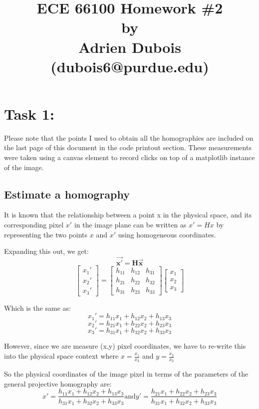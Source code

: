 \documentclass{article}
\title{\Large \textbf{ECE 66100 Homework \#2\\[0.1in] by\\ [0.1in] Adrien Dubois (dubois6@purdue.edu)}}
\begin{document}
\maketitle
\section{Task 1:}
Please note that the points I used to obtain all the homographies are included on the last page of this document in the code printout section. These measurements were taken using a canvas element to record clicks on top of a matplotlib instance of the image.

\subsection{Estimate a homography}\label{sec:estimate-homography}
It is known that the relationship between a point x in the physical space, and its corresponding pixel $x'$ in the image plane can be written as \(x' = Hx\) by representing the two points $x$ and $x'$ using homogeneous coordinates.


Expanding this out, we get:
\[\boldsymbol{\Vec{x'}} = \boldsymbol{H} \boldsymbol{\Vec{x}}\]
\[
\begin{bmatrix}
    x_1' \\ x_2' \\ x_3'
\end{bmatrix} = \begin{bmatrix}
    h_{11} & h_{12} & h_{31} \\
    h_{21} & h_{22} & h_{32} \\
    h_{31} & h_{23} & h_{33}
\end{bmatrix} \begin{bmatrix}
    x_1 \\ x_2 \\ x_3
\end{bmatrix}
\] 

Which is the same as:
\[x_1' = h_{11} x_1 + h_{12} x_2 + h_{13} x_3\]
\[x_2' = h_{21} x_1 + h_{22} x_2 + h_{23} x_3\]
\[x_3' = h_{31} x_1 + h_{32} x_2 + h_{33} x_3\]

However, since we are measure (x,y) pixel coordinates, we have to re-write this into the physical space context where $x = \frac{x_1}{x_3}$ and $y = \frac{x_2}{x_3}$

So the physical coordinates of the image pixel in terms of the parameters of the general projective homography are:
\[x' = \frac{h_{11}x_1 + h_{12}x_2 + h_{13}x_3}{h_{31}x_1 + h_{32}x_2 + h_{33}x_3} \text{and} y' = \frac{h_{21}x_1 + h_{22}x_2 + h_{23}x_3}{h_{31}x_1 + h_{32}x_2 + h_{33}x_3}\]
\end{document}

